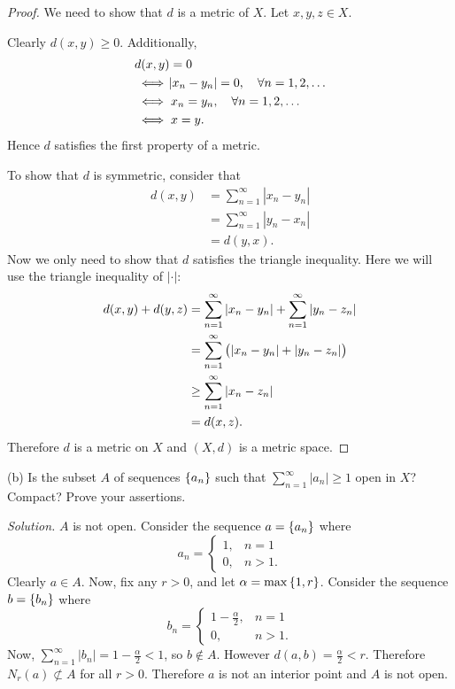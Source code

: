 \documentclass{article}
\begin{document}
\begin{proof}

We need to show that $d$ is a metric of $X$. Let $x, y, z \in X$.

Clearly $d(x, y) \geq 0$. Additionally,
%
\begin{align*}
    &d(x, y) = 0 \\
    &\iff \envert{x_n - y_n} = 0, \quad \forall n = 1, 2, \ldots \\
    &\iff x_n = y_n, \quad \forall n = 1, 2, \ldots \\
    &\iff x = y
    .
\end{align*}
%
Hence $d$ satisfies the first property of a metric.

To show that $d$ is symmetric, consider that
%
\begin{align*}
    d(x, y)
        &= \sum_{n = 1}^\infty |x_n - y_n| \\
        &= \sum_{n = 1}^\infty |y_n - x_n| \\
        &= d(y, x)
        .
\end{align*}
%
Now we only need to show that $d$ satisfies the triangle inequality.
Here we will use the triangle inequality of $|\cdot|$:
%
\begin{align*}
    d(x, y) + d(y, z)
        &= \sum_{n = 1}^\infty |x_n - y_n| + \sum_{n = 1}^\infty |y_n - z_n| \\
        &= \sum_{n = 1}^\infty \del{|x_n - y_n| + |y_n - z_n|} \\
        &\geq \sum_{n = 1}^\infty |x_n - z_n| \\
        &= d(x, z)
        .
\end{align*}
%
Therefore $d$ is a metric on $X$ and $(X, d)$ is a metric space.

\end{proof}

(b) Is the subset $A$ of sequences $\cbr{a_n}$ such that $\sum_{n =
1}^\infty |a_n| \geq 1$ open in $X$? Compact? Prove your assertions.

\textit{Solution.}
$A$ is not open. Consider the sequence $a = \cbr{a_n}$ where
%
\begin{equation*}
    a_n = \begin{cases}
        1, &n = 1 \\
        0, &n > 1.
    \end{cases}
\end{equation*}
%
Clearly $a \in A$. Now, fix any $r > 0$, and let $\alpha =
\max\cbr{1, r}$. Consider the sequence $b = \cbr{b_n}$ where
%
\begin{equation*}
    b_n = \begin{cases}
        1 - \frac{\alpha}{2}, &n = 1 \\
        0, &n > 1.
    \end{cases}
\end{equation*}
%
Now, $\sum_{n = 1}^\infty |b_n| = 1 - \frac{\alpha}{2} < 1$, so $b
\not\in A$. However $d(a, b) = \frac{\alpha}{2} < r$. Therefore $N_r(a)
\not\subset A$ for all $r > 0$. Therefore $a$ is not an interior point
and $A$ is not open.
\end{document}

